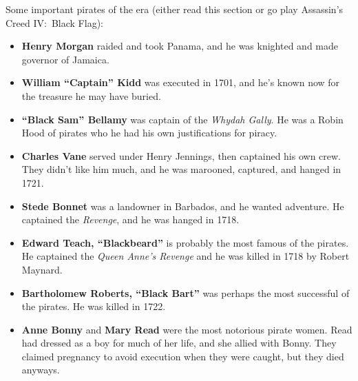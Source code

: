 Some important pirates of the era
(either read this section or go play Assassin's Creed IV:\ Black Flag):

\begin{itemize}
  \item
    \textbf{Henry Morgan} raided and took Panama, and he was knighted and made governor of Jamaica.

  \item
    \textbf{William ``Captain'' Kidd} was executed in 1701,
    and he's known now for the treasure he may have buried.

  \item
    \textbf{``Black Sam'' Bellamy} was captain of the \textit{Whydah Gally}.
    He was a Robin Hood of pirates who he had his own justifications for piracy.

  \item
    \textbf{Charles Vane} served under Henry Jennings, then captained his own crew.
    They didn't like him much, and he was marooned, captured, and hanged in 1721.

  \item
    \textbf{Stede Bonnet} was a landowner in Barbados, and he wanted adventure.
    He captained the \textit{Revenge}, and he was hanged in 1718.

  \item
    \textbf{Edward Teach, ``Blackbeard''} is probably the most famous of the pirates.
    He captained the \textit{Queen Anne's Revenge} and he was killed in 1718 by Robert Maynard.

  \item
    \textbf{Bartholomew Roberts, ``Black Bart''} was perhaps the most successful of the pirates.
    He was killed in 1722.

  \item
    \textbf{Anne Bonny} and \textbf{Mary Read} were the most notorious pirate women.
    Read had dressed as a boy for much of her life, and she allied with Bonny.
    They claimed pregnancy to avoid execution when they were caught, but they died anyways.
\end{itemize}
